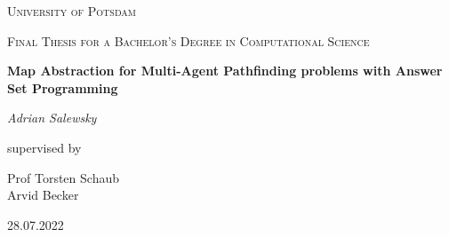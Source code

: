 \documentclass[runningheads]{llncs}
\begin{document}
\begin{titlepage}
\centering
{\scshape\LARGE University of Potsdam \par}
\vspace{1cm}
{\scshape\Large Final Thesis for a Bachelor's Degree in Computational Science\par}
\vspace{1.5cm}
{\huge\bfseries Map Abstraction for Multi-Agent Pathfinding problems with Answer Set Programming\par}
\vspace{2cm}
{\Large\itshape Adrian Salewsky\par}
\vfill
supervised by\par 
\vspace{\baselineskip}
Prof Torsten Schaub \\
\vspace{\baselineskip}
Arvid Becker
\vfill
{28.07.2022 \par}

\begin{abstract}
Multi-Agent Pathfinding stellt ein wichtiges Problem in der Informatik dar. Folglich wird versucht, die Geschwindigkeit von entsprechenden Lösungsalgorithmen ständig zu verbessern.
In dieser Arbeit stelle ich meine Methoden zur Kartenabstraktion für solche Probleme dar und zeige auf, wie diese genutzt werden können, um entsprechende Probleme
schneller zu lösen. Es wurde das deklarative Programmierparadigma Answer Set Programming genutzt, um die Abstraktion zu bilden. Weiterhin wurde Python verwendet, um verschiedene Hilfsprogramme zu erstellen.
Als Vergleichswert für die Lösungszeit wurde das Framework ``asprilo'' genutzt, das ebenfalls Answer Set Programming nutzt. Die Arbeit wurde in englischer Sprache verfasst. 		
\end{abstract}
\end{titlepage}
\end{document}
